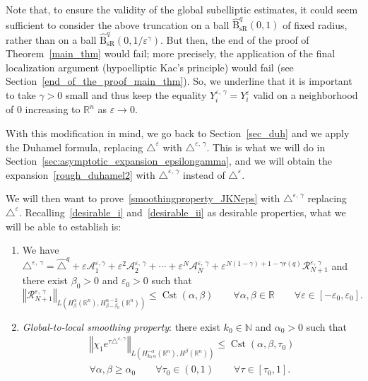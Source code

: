 \documentclass[AHL,Unicode,published]{cedram}
\newcommand*\R{\mathbb{R}}
\newcommand*\N{\mathbb{N}}
\newcommand{\calA}{\mathcal{A}}
\newcommand{\calR}{\mathcal{R}}
\DeclareMathOperator{\Cst}{Cst}
\newcommand{\hatBsR}{\widehat{\mathrm{B}}_{\mathrm{sR}}}
\renewcommand{\geq}{\geqslant}
\renewcommand{\leq}{\leqslant}
\newcommand*{\Penumi}{\renewcommand*{\theenumi}{$\mathbf{P}_\arabic{enumi}$}}
\let\oldforall\forall
\renewcommand*{\forall}{\mathrel{\oldforall}}
\begin{document}
Note that, to ensure the validity of the global subelliptic estimates, it could seem sufficient to consider the above truncation on a ball $\hatBsR^{q}(0,1)$ of fixed radius, rather than on a ball $\hatBsR^{q}(0,1/\varepsilon^\gamma)$. But then, the end of the proof of Theorem~\ref{main_thm} would fail; more precisely, the application of the final localization argument (hypoelliptic Kac's principle) would fail (see Section~\ref{end_of_the_proof_main_thm}). So, we underline that it is important to take $\gamma>0$ small and thus keep the equality $Y_i^{\varepsilon,\,\gamma} = Y_i^\varepsilon$ valid on a neighborhood of $0$ increasing to $\R^n$ as $\varepsilon\rightarrow 0$.


With this modification in mind, we go back to Section~\ref{sec_duh} and we apply the Duhamel formula, replacing $\triangle^\varepsilon$ with $\triangle^{\varepsilon,\,\gamma}$. This is what we will do in Section~\ref{sec:asymptotic_expansion_epsilongamma}, and we will obtain the expansion~\eqref{rough_duhamel2} with $\triangle^{\varepsilon,\,\gamma}$ instead of $\triangle^\varepsilon$.

We will then want to prove~\eqref{smoothingproperty_JKNeps} with $\triangle^{\varepsilon,\,\gamma}$ replacing $\triangle^\varepsilon$. Recalling~\eqref{desirable_i} and~\eqref{desirable_ii} as desirable properties, what we will be able to establish is:
\begin{enumerate}\Penumi
\setcounter{enumi}{4}
\item\label{Repsgam}
We have $\triangle^{\varepsilon,\,\gamma} = \widehat{\triangle}^{q} + \varepsilon \calA_1^{\varepsilon,\gamma} + \varepsilon^2 \calA_2^{\varepsilon,\,\gamma} + \cdots + \varepsilon^N \calA_N^{\varepsilon,\,\gamma} + \varepsilon^{N(1-\gamma)+1-\gamma r(q)} \calR_{N+1}^{\varepsilon,\,\gamma}$ and there exist $\beta_0>0$ and $\varepsilon_0>0$ such that
\[
\left\Vert \calR_{N+1}^{\varepsilon,\,\gamma}\right\Vert_{L\left(H^\alpha_\beta(\R^n),H^{\alpha-2}_{\beta-\beta_0}(\R^n)\right)} \leq \Cst(\alpha,\beta) \qquad \forall\alpha,\beta\in\R \qquad \forall\varepsilon\in[-\varepsilon_0,\varepsilon_0].
\]

\item\label{globsmootheps}
\emph{Global-to-local smoothing property}: there exist $k_0\in\N$ and $\alpha_0>0$ such that
\begin{multline*}
\left\Vert \chi_1 e^{\tau \triangle^{\varepsilon,\,\gamma}}\right\Vert_{L\left(H^{-\alpha}_{k_0\,\alpha}(\R^n),H^{\beta}(\R^n)\right)} \leq \Cst(\alpha,\beta,\tau_0) \\
\forall \alpha,\beta\geq\alpha_0 \qquad \forall \tau_0\in(0,1) \qquad \forall\tau\in[\tau_0,1].
\end{multline*}
\end{enumerate}
\end{document}

